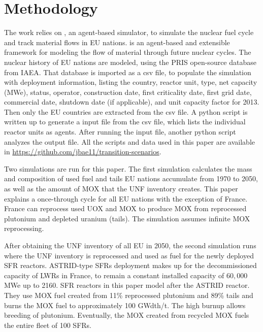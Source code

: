 \section{Methodology}
The work relies on \Cyclus, an agent-based simulator, to simulate the nuclear fuel cycle
and track material flows in \gls{EU} nations. \Cyclus is an agent-based and extensible
framework for modeling the flow of material through future nuclear cycles. 
The nuclear history of EU nations are modeled, using the \gls{PRIS} open-source 
database from \gls{IAEA}. That database is imported as a csv file, to populate the simulation
with deployment information, listing the country, reactor unit, type, net capacity (MWe), status,
operator, construction date, first criticality date, first grid date, commercial date, shutdown
date (if applicable), and unit capacity factor for 2013. Then only the \gls{EU} countries are extracted
from the csv file. A python script is written up to generate a \Cyclus input file from the csv file,
which lists the individual reactor units as agents. After running the \Cyclus input file,
another python script analyzes the output file. All the scripts and data used
in this paper are available in \url{https://github.com/jbae11/transition-scenarios}.

Two \Cyclus simulations are run for this paper. 
The first simulation calculates
the mass and composition of used fuel and tails \gls{EU} nations accumulate from 1970 to 2050,
as well as the amount of \gls{MOX} that the \gls{UNF} inventory creates.
This paper explains a once-through cycle for all 
\gls{EU} nations with the exception of France. France can reprocess used \gls{UOX} and \gls{MOX} to
produce \gls{MOX} from reprocessed plutonium and depleted uranium (tails).
The simulation assumes infinite \gls{MOX} reprocessing. 

After obtaining the \gls{UNF} inventory of all \gls{EU} in 2050, the second
simulation runs where the \gls{UNF} inventory is reprocessed and used
as fuel for the newly deployed \gls{SFR} reactors.
ASTRID-type \glspl{SFR} deployment makes up for the decommissioned capacity
of \glspl{LWR} in France, to remain a constant installed capacity of $60,000$ MWe up to 2160.
\gls{SFR} reactors in this paper model after the ASTRID reactor.
They use \gls{MOX} fuel created from 11\% reprocessed plutonium
and 89\% tails and burns the \gls{MOX} fuel to approximately 100 GWdth/t.
The high burnup allows breeding of plutonium.
Eventually, the  \gls{MOX} created from recycled \gls{MOX}
fuels the entire fleet of 100 \glspl{SFR}.


